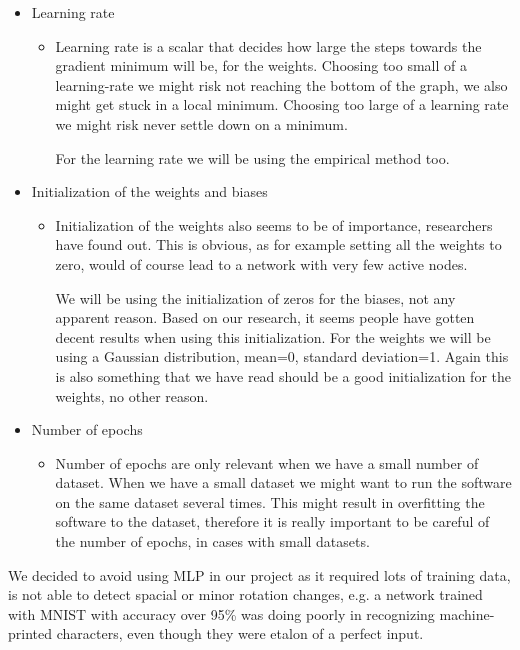 \documentclass[Report.tex]{subfiles}
\begin{document}
\begin{flushleft}
\begin{itemize}
\begin{itemize}
   \end{itemize}
   \item{Learning rate}
   \begin{itemize}
    \item{Learning rate is a scalar that decides how large the steps towards the gradient minimum will be, for the weights. Choosing too small of a learning-rate we might risk not reaching the bottom of the graph, we also might get stuck in a local minimum. Choosing too large of a learning rate we might risk never settle down on a minimum. \par
    For the learning rate we will be using the empirical method too.}
   \end{itemize}
   \item{Initialization of the weights and biases}
   \begin{itemize}
    \item{Initialization of the weights also seems to be of importance, researchers have found out. This is obvious, as for example setting all the weights to zero, would of course lead to a network with very few active nodes. \par
    We will be using the initialization of zeros for the biases, not any apparent reason. Based on our research, it seems people have gotten decent results when using this initialization. For the weights we will be using a Gaussian distribution, mean=0, standard deviation=1. Again this is also something that we have read should be a good initialization for the weights, no other reason.}
   \end{itemize}
   \item{Number of epochs}
   \begin{itemize}
    \item{Number of epochs are only relevant when we have a small number of dataset. When we have a small dataset we might want to run the software on the same dataset several times. This might result in overfitting the software to the dataset, therefore it is really important to be careful of the number of epochs, in cases with small datasets.}
   \end{itemize}
  \end{itemize}
\end{flushleft}

\begin{flushleft}
We decided to avoid using MLP in our project as it required lots of training data, is not able to detect spacial or minor rotation changes, e.g. a network trained with MNIST with accuracy over 95\% was doing poorly in recognizing machine-printed characters, even though they were etalon of a perfect input. 

\end{flushleft}
\end{document}
